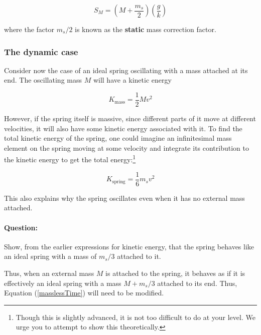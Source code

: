 \begin{refsection}
\begin{equation}
S_M = \left( M + \frac{m_s}{2} \right)\left(\frac{g}{k} \right)
\label{Sm}
\end{equation}

where the factor $m_s/2$ is known as the \textbf{static} mass correction factor.


\subsubsection*{The dynamic case}

Consider now the case of an ideal spring oscillating with a mass attached at its end. The oscillating mass $M$ will have a kinetic energy 

\begin{equation*}
    K_\text{mass} = \frac{1}{2} M v^2
\end{equation*}

However, if the spring itself is massive, since different parts of it move at different velocities, it will also have some kinetic energy associated with it. To find the total kinetic energy of the spring, one could imagine an infinitesimal mass element on the spring moving at some velocity and integrate its contribution to the kinetic energy to get the total energy:\footnote{Though this is slightly advanced, it is not too difficult to do at your level. We urge you to attempt to show this theoretically.}

\begin{equation}
    K_\text{spring} = \frac{1}{6} m_s v^2
\end{equation}

\begin{imp}
This also explains why the spring oscillates even when it has no external mass attached.
\end{imp}

\begin{question}
\paragraph{Question:} Show, from the earlier expressions for kinetic energy, that the spring behaves like an ideal spring with a mass of $m_s/3$ attached to it.
\end{question}

Thus, when an external mass $M$ is attached to the spring, it behaves as if it is effectively an ideal spring with a mass $M+ m_s/3$ attached to its end. Thus, Equation (\ref{masslessTime}) will need to be modified.


\end{refsection}
